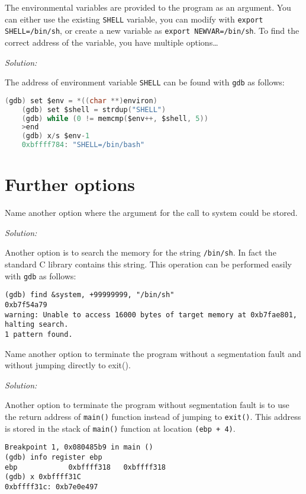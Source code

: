 \documentclass[a4paper,11pt]{article}
\newenvironment{solution}%
{\par{\noindent\small\textit{Solution:}}\vspace{-12pt}\begin{framed}}%
{\end{framed}\par}
\begin{document}
The environmental variables are provided to the program as an argument. You can
either use the existing \texttt{SHELL} variable, you can modify with
\texttt{export SHELL=/bin/sh}, or create a new variable as \texttt{export
NEWVAR=/bin/sh}. To find the correct address of the variable, you have multiple
options\dots
 
\ifsolution
\begin{solution}
  The address of environment variable \texttt{SHELL} can be found with \texttt{gdb} as follows:
  \begin{lstlisting}[language=c]
    (gdb) set $env = *((char **)environ)
    (gdb) set $shell = strdup("SHELL")
    (gdb) while (0 != memcmp($env++, $shell, 5))
    >end
    (gdb) x/s $env-1
    0xbffff784:	"SHELL=/bin/bash"
  \end{lstlisting}
\end{solution}\fi


\section*{Further options}
Name another option where the argument for the call to system could be stored.
\newpage
\ifsolution
\begin{solution}
Another option is to search the memory for the string \texttt{/bin/sh}.  In fact the 
standard C library contains this string. This operation can be performed easily with \texttt{gdb} as follows:
\begin{lstlisting}
(gdb) find &system, +99999999, "/bin/sh"
0xb7f54a79
warning: Unable to access 16000 bytes of target memory at 0xb7fae801, halting search.
1 pattern found.
\end{lstlisting}
\end{solution}\fi

\noindent
Name another option to terminate the program without a segmentation fault and
without jumping directly to exit().  
\ifsolution
\begin{solution}
Another option to terminate the program without segmentation fault is to use the return address of \texttt{main()}
function instead of jumping to \texttt{exit()}. This address is stored in the stack of \texttt{main()} function 
at location \texttt{(ebp + 4)}. 
\begin{lstlisting}
Breakpoint 1, 0x080485b9 in main ()
(gdb) info register ebp
ebp            0xbffff318	0xbffff318
(gdb) x 0xbffff31C
0xbffff31c:	0xb7e0e497
\end{lstlisting} 
\end{solution}\fi
\end{document}
